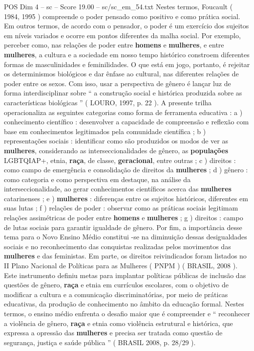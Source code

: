 \begin{textsample}{POS Dim 4 – sc – Score 19.00 – sc/sc\_em\_54.txt}
Nestes termos, Foucault ( 1984, 1995 ) compreende o poder pensado como positivo e como prática social.
Em outros termos, de acordo com o pensador, o poder é um exercício dos sujeitos em níveis variados e ocorre em pontos diferentes da malha social.
Por exemplo, perceber como, nas relações de poder entre \textbf{homens} e \textbf{mulheres}, e entre \textbf{mulheres}, a cultura e a sociedade em nosso tempo histórico constroem diferentes formas de masculinidades e feminilidades.
O que está em jogo, portanto, é rejeitar os determinismos biológicos e dar ênfase ao cultural, nas diferentes relações de poder entre os sexos.
Com isso, usar a perspectiva de gênero é lançar luz de forma interdisciplinar sobre “ a construção social e histórica produzida sobre as características biológicas ” ( LOURO, 1997, p. 22 ).
A presente trilha operacionaliza as seguintes categorias como forma de ferramenta educativa : a ) conhecimento científico : desenvolver a capacidade de compreensão e reflexão com base em conhecimentos legitimados pela comunidade científica ; b ) representações sociais : identificar como são produzidos os modos de ver as \textbf{mulheres}, considerando as interseccionalidades de gênero, as \textbf{populações} LGBTQIAP+, etnia, \textbf{raça}, de classe, \textbf{geracional}, entre outras ; c ) direitos : como campo de emergência e consolidação de direitos da \textbf{mulheres} ; d ) gênero : como categoria e como perspectiva em destaque, na análise da interseccionalidade, ao gerar conhecimentos científicos acerca das \textbf{mulheres} catarinenses ; e ) \textbf{mulheres} : diferenças entre os sujeitos históricos, diferentes em suas lutas ; f ) relações de poder : observar como as práticas sociais legitimam relações assimétricas de poder entre \textbf{homens} e \textbf{mulheres} ; g ) direitos : campo de lutas sociais para garantir igualdade de gênero.
Por fim, a importância desse tema para o Novo Ensino Médio constitui -se na diminuição dessas desigualdades sociais e no reconhecimento das conquistas realizadas pelos movimentos das \textbf{mulheres} e das feministas.
Em parte, os direitos reivindicados foram listados no II Plano Nacional de Políticas para as Mulheres ( PNPM ) ( BRASIL, 2008 ).
Este instrumento definiu metas para implantar políticas públicas de inclusão das questões de gênero, \textbf{raça} e etnia em currículos escolares, com o objetivo de modificar a cultura e a comunicação discriminatórias, por meio de práticas educativas, da produção de conhecimento no âmbito da educação formal.
Nestes termos, o ensino médio enfrenta o desafio maior que é compreender e “ reconhecer a violência de gênero, \textbf{raça} e etnia como violência estrutural e histórica, que expressa a opressão das \textbf{mulheres} e precisa ser tratada como questão de segurança, justiça e saúde pública ” ( BRASIL 2008, p. 28/29 ).

\end{textsample}

